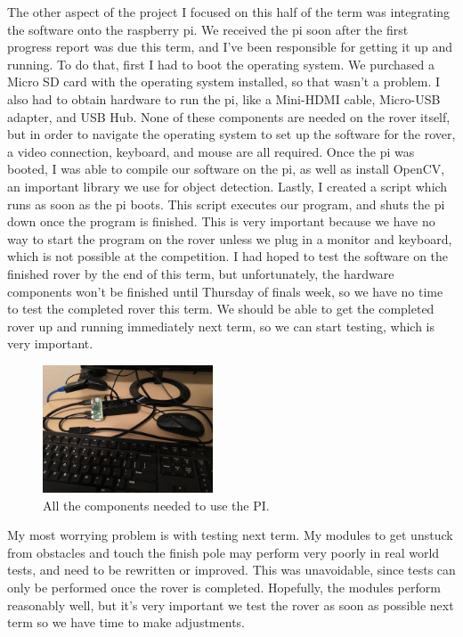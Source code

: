 \documentclass[10pt,letterpaper,onecolumn,journal]{IEEEtran}
\begin{document}
The other aspect of the project I focused on this half of the term was integrating the software onto the raspberry pi. We received the pi soon after the first progress report was due this term, and I've been responsible for getting it up and running. To do that, first I had to boot the operating system. We purchased a Micro SD card with the operating system installed, so that wasn’t a problem. I also had to obtain hardware to run the pi, like a Mini-HDMI cable, Micro-USB adapter, and USB Hub. None of these components are needed on the rover itself, but in order to navigate the operating system to set up the software for the rover, a video connection, keyboard, and mouse are all required. Once the pi was booted, I was able to compile our software on the pi, as well as install OpenCV, an important library we use for object detection. Lastly, I created a script which runs as soon as the pi boots. This script executes our program, and shuts the pi down once the program is finished. This is very important because we have no way to start the program on the rover unless we plug in a monitor and keyboard, which is not possible at the competition. I had hoped to test the software on the finished rover by the end of this term, but unfortunately, the hardware components won't be finished until Thursday of finals week, so we have no time to test the completed rover this term. We should be able to get the completed rover up and running immediately next term, so we can start testing, which is very important.\vspace{.3cm}

\begin{figure}[h]
  \centering
  \includegraphics[width=0.45\textwidth,angle=180]{pic1.jpg}
  \caption{All the components needed to use the PI.}
  \label{fig:1}
\end{figure}

\par
My most worrying problem is with testing next term. My modules to get unstuck from obstacles and touch the finish pole may perform very poorly in real world tests, and need to be rewritten or improved. This was unavoidable, since tests can only be performed once the rover is completed. Hopefully, the modules perform reasonably well, but it's very important we test the rover as soon as possible next term so we have time to make adjustments. 
\end{document}
